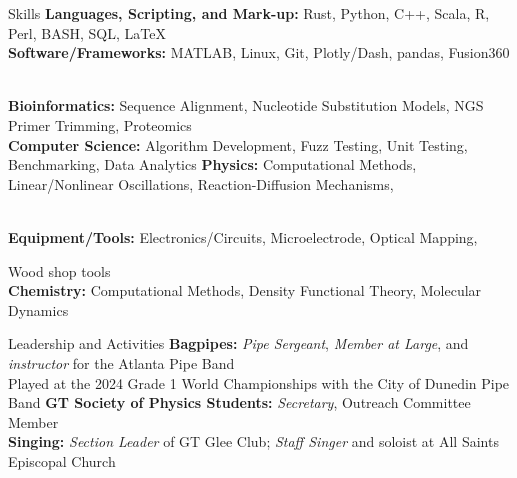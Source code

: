 \documentclass{resume} %
\begin{document}
\begin{rSection}{Skills}
  \textbf{Languages, Scripting, and Mark-up:} Rust, Python, C++, Scala, R, Perl, BASH, SQL, LaTeX \\
  \textbf{Software/Frameworks:} MATLAB, Linux, Git, Plotly/Dash, pandas, Fusion360 \\
  \textbf{Bioinformatics:} Sequence Alignment, Nucleotide Substitution Models, NGS Primer Trimming, Proteomics \\
  \textbf{Computer Science:} Algorithm Development, Fuzz Testing, Unit Testing, Benchmarking, Data Analytics
  \textbf{Physics:} Computational Methods, Linear/Nonlinear Oscillations, Reaction-Diffusion Mechanisms,\\
  \textbf{Equipment/Tools:} Electronics/Circuits, Microelectrode, Optical Mapping, Wood shop tools\\
  \textbf{Chemistry:} Computational Methods, Density Functional Theory, Molecular Dynamics 
\end{rSection}
\begin{rSection}{Leadership and Activities}
  \textbf{Bagpipes:} \textit{Pipe Sergeant}, \textit{Member at Large}, and \textit{instructor} for the Atlanta Pipe Band \\
  \-\hspace{2cm} Played at the 2024 Grade 1 World Championships with the City of Dunedin Pipe Band
  \textbf{GT Society of Physics Students:} \textit{Secretary}, Outreach Committee Member \\
  \textbf{Singing:} \textit{Section Leader} of GT Glee Club; \textit{Staff Singer} and soloist at All Saints Episcopal Church  \\

\end{rSection}
\end{document}
